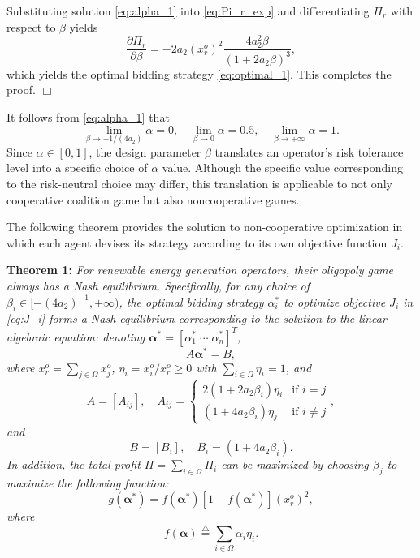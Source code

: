 \documentclass[conference]{IEEEtran}
\begin{document}
Substituting solution \eqref{eq:alpha_1} into 
\eqref{eq:Pi_r_exp} and differentiating $\Pi_r$ with respect to $\beta$ yields
\[ \frac{\partial \Pi_r}{\partial \beta} = - 2a_2(x_r^o)^2\frac{4a_2^2\beta}{(1+2a_2\beta)^3}, \]
which yields the optimal bidding strategy \eqref{eq:optimal_1}. This completes the proof. \hfill $\Box$

It follows from \eqref{eq:alpha_1} that
\[ \lim_{\beta\rightarrow-1/(4a_2)} \alpha = 0, \quad  \lim_{\beta\rightarrow0} \alpha = 0.5, \quad \lim_{\beta\rightarrow +\infty} \alpha = 1. \]
Since $\alpha\in[0,1]$, the design parameter $\beta$ translates an operator's risk tolerance level into a specific choice of $\alpha$ value. Although the specific value corresponding to the risk-neutral choice may differ, this translation is applicable to not only cooperative coalition game but also noncooperative games. 

The following theorem provides the solution to non-cooperative optimization in which each agent devises its strategy according to its own objective function $J_i$. 

\noindent \textbf{Theorem 1:} {\it For renewable energy generation operators, their oligopoly game always has a Nash equilibrium. Specifically,
for any choice of $\beta_i\in[-(4a_2)^{-1},+\infty)$, the optimal bidding strategy $\alpha_i^*$ to optimize objective $J_i$ in \eqref{eq:J_i} forms a Nash equilibrium corresponding to the solution to the linear algebraic equation:
denoting $\boldsymbol{\alpha}^*=[\alpha_1^* \; \cdots \; \alpha_n^*]^T$,
\begin{equation}
A \boldsymbol{\alpha}^* = B,
\label{eq:alpha_i}
\end{equation}
where $x_r^o = \sum_{j\in\Omega} x_j^o$, $\eta_i = x_i^o/x_r^o\geq0$ with $\sum_{i\in\Omega} \eta_i=1$, and
\[ A=[A_{ij}], \quad A_{ij} = \left\{ \begin{array}{ll} 2(1+2a_2\beta_i)\eta_i & \mbox{if $i=j$} \\
(1+4a_2\beta_i)\eta_j & \mbox{if $i\not=j$}\end{array} \right., \]
and
\[ B=[B_i], \quad B_i = (1+4a_2\beta_i). \]
In addition,  the total profit $\Pi=\sum_{i\in\Omega}\Pi_i$ can be maximized by choosing $\beta_j$ to maximize the following function: 
\begin{equation} 
g(\boldsymbol{\alpha}^*) = f(\boldsymbol{\alpha}^*) \left[ 1 - f(\boldsymbol{\alpha}^*)  \right](x_r^o)^2,
\label{eq:G}
\end{equation} 
where  
\begin{equation} 
f(\boldsymbol{\alpha}) \stackrel{\triangle}{=} \sum_{i\in\Omega}  \alpha_i \eta_i.  
\label{eq:F}
\end{equation} 
}
\end{document}
